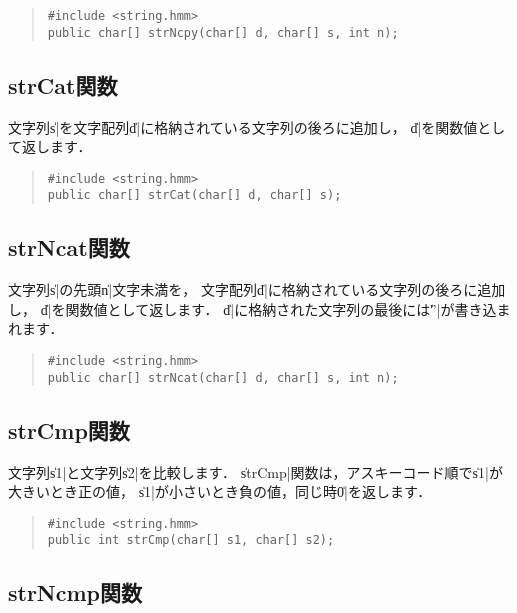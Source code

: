 \begin{quote}
\begin{verbatim}
#include <string.hmm>
public char[] strNcpy(char[] d, char[] s, int n);
\end{verbatim}
\end{quote}

\subsection{strCat関数}

文字列\|s|を文字配列\|d|に格納されている文字列の後ろに追加し，
\|d|を関数値として返します．

\begin{quote}
\begin{verbatim}
#include <string.hmm>
public char[] strCat(char[] d, char[] s);
\end{verbatim}
\end{quote}

\subsection{strNcat関数}

文字列\|s|の先頭\|n|文字未満を，
文字配列\|d|に格納されている文字列の後ろに追加し，
\|d|を関数値として返します．
\|d|に格納された文字列の最後には\|'\0'|が書き込まれます．

\begin{quote}
\begin{verbatim}
#include <string.hmm>
public char[] strNcat(char[] d, char[] s, int n);
\end{verbatim}
\end{quote}

\subsection{strCmp関数}

文字列\|s1|と文字列\|s2|を比較します．
\|strCmp|関数は，アスキーコード順で\|s1|が大きいとき正の値，
\|s1|が小さいとき負の値，同じ時\|0|を返します．

\begin{quote}
\begin{verbatim}
#include <string.hmm>
public int strCmp(char[] s1, char[] s2);
\end{verbatim}
\end{quote}

\subsection{strNcmp関数}

